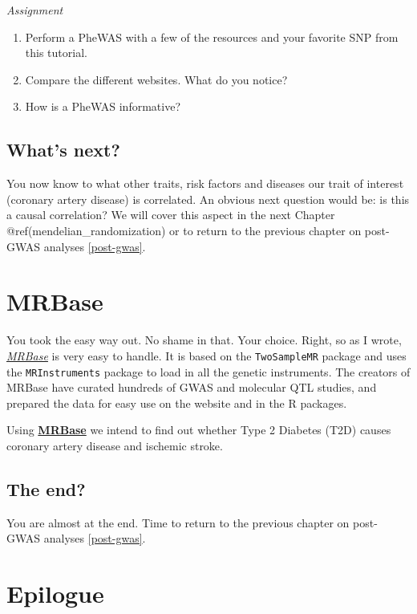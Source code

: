 \documentclass[
]{book}
\newcommand{\passthrough}[1]{#1}
\providecommand{\tightlist}{%
  \setlength{\itemsep}{0pt}\setlength{\parskip}{0pt}}
\begin{document}
\emph{Assignment}

\begin{enumerate}
\def\labelenumi{\arabic{enumi}.}
\tightlist
\item
  Perform a PheWAS with a few of the resources and your favorite SNP from this tutorial.
\item
  Compare the different websites. What do you notice?
\item
  How is a PheWAS informative?
\end{enumerate}

\hypertarget{whats-next}{%
\section{What's next?}\label{whats-next}}

You now know to what other traits, risk factors and diseases our trait of interest (coronary artery disease) is correlated. An obvious next question would be: is this a causal correlation? We will cover this aspect in the next Chapter @ref(mendelian\_randomization) or to return to the previous chapter on post-GWAS analyses \ref{post-gwas}.

\hypertarget{mr_mrbase}{%
\chapter{MRBase}\label{mr_mrbase}}

You took the easy way out. No shame in that. Your choice. Right, so as I wrote, \emph{\href{http://www.mrbase.org/}{MRBase}} is very easy to handle. It is based on the \passthrough{\lstinline!TwoSampleMR!} package and uses the \passthrough{\lstinline!MRInstruments!} package to load in all the genetic instruments. The creators of MRBase have curated hundreds of GWAS and molecular QTL studies, and prepared the data for easy use on the website and in the R packages.

Using \textbf{\href{http://www.mrbase.org/}{MRBase}} we intend to find out whether Type 2 Diabetes (T2D) causes coronary artery disease and ischemic stroke.

\hypertarget{the-end}{%
\section{The end?}\label{the-end}}

You are almost at the end. Time to return to the previous chapter on post-GWAS analyses \ref{post-gwas}.

\hypertarget{epilogue}{%
\chapter{Epilogue}\label{epilogue}}
\end{document}

